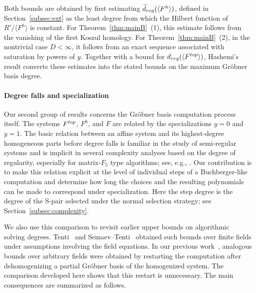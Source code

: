 \documentclass{article}
\theoremstyle{definition}
\theoremstyle{plain}
\theoremstyle{plain}
\theoremstyle{plain}
\theoremstyle{plain}
\numberwithin{equation}{subsection}
\begin{document}
Both bounds are obtained by first estimating $\widetilde d_{\rm reg}(\langle F^h\rangle)$, defined in Section~\ref{subsec:ext} as the least degree from which the Hilbert function of $R'/\langle F^h\rangle$ is constant.
For Theorem~\ref{thm:mainB}~{\rm (1)}, this estimate follows from the vanishing of the first Koszul homology.
For Theorem~\ref{thm:mainB}~{\rm (2)}, in the nontrivial case $D<\infty$, it follows from an exact sequence associated with saturation by powers of $y$.
Together with a bound for $d_{\rm reg}(\langle F^{\rm top}\rangle)$, Hashemi's result converts these estimates into the stated bounds on the maximum Gr\"obner basis degree.

\paragraph{Degree falls and specialization}

Our second group of results concerns the Gr\"obner basis computation process itself.
The systems $F^{\rm top}$, $F^h$, and $F$ are related by the specializations $y=0$ and $y=1$.
The basic relation between an affine system and its highest-degree homogeneous parts before degree falls is familiar in the study of semi-regular systems and is implicit in several complexity analyses based on the degree of regularity, especially for matrix-$F_5$ type algorithms; see, e.g., \cite{Bar,BFS,BFSY,BFS-F5}.
Our contribution is to make this relation explicit at the level of individual steps of a Buchberger-like computation and determine how long the choices and the resulting polynomials can be made to correspond under specialization.
Here the step degree is the degree of the S-pair selected under the normal selection strategy; see Section~\ref{subsec:complexity}.

We also use this comparison to revisit earlier upper bounds on algorithmic solving degrees.
Tenti~\cite{Tenti} and Semaev--Tenti~\cite{ST} obtained such bounds over finite fields under assumptions involving the field equations.
In our previous work~\cite{KY}, analogous bounds over arbitrary fields were obtained by restarting the computation after dehomogenizing a partial Gr\"obner basis of the homogenized system.
The comparison developed here shows that this restart is unnecessary.
The main consequences are summarized as follows.
\end{document}
